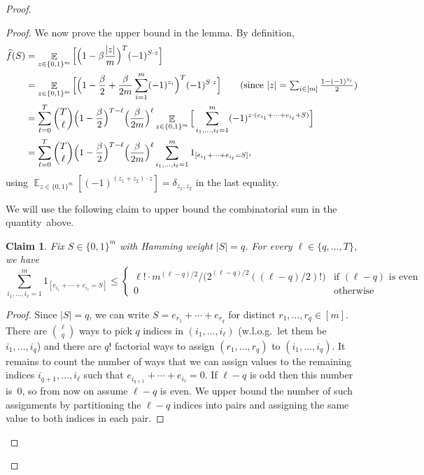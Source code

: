\documentclass[twoside,11pt]{article}
\DeclareMathOperator*{\Ex}{\mathbb{E}}
\newtheorem{claim}[theorem]{Claim}
\def\01{\{0,1\}}
\begin{document}
\begin{proof}
\begin{proof}
		We now prove the upper bound in the lemma. By definition,
		\begin{align*}
		\widehat{f}(S)&=\Ex_{z\in \01^m} \Big[\Big(1-\beta\frac{|z|}{m}\Big)^T (-1)^{S\cdot z}\Big] \\
		&=\Ex_{z\in \01^m} \Big[\Big(1-\frac{\beta}{2}+\frac{\beta}{2m} \sum_{i=1}^m (-1)^{z_i}\Big)^T (-1)^{S\cdot z} \Big]\tag{since $|z|=\sum_{i\in [m]} \frac{1-(-1)^{z_i}}{2}$}\\
		&=\sum_{\ell=0}^T \binom{T}{\ell} \Big(1-\frac{\beta}{2}\Big)^{T-\ell}\Big(\frac{\beta}{2m}\Big)^{\ell} \Ex_{z\in \01^m} \Big[\sum_{i_1,\ldots, i_\ell=1}^m (-1)^{z\cdot (e_{i_1}+\cdots+e_{i_\ell}+S)}\Big]\\
		&=\sum_{\ell=0}^T \binom{T}{\ell} \Big(1-\frac{\beta}{2}\Big)^{T-\ell}\Big(\frac{\beta}{2m}\Big)^{\ell}\sum_{i_1,\ldots, i_\ell=1}^m 1_{[e_{i_1}+\cdots+e_{i_\ell}=S]},
		\end{align*}
using $\Ex_{z\in \01^m} [(-1)^{(z_1+z_2)\cdot z}]=\delta_{z_1,z_2}$ in the last equality.

		We will use the following claim to upper bound the combinatorial sum in the quantity~above. \\
		
		\begin{claim}
			\label{claim:combinatorialcounting}
			Fix $S\in \01^m$ with Hamming weight $|S|=q$. For every $\ell\in \{q,\ldots, T\}$, we have
			\[\sum_{i_1,\ldots, i_\ell=1}^m 1_{[e_{i_1}+\cdots+e_{i_\ell}=S]}\leq 
			\begin{cases} 
			\ell! \cdot m^{(\ell-q)/2}\Big/ \Big(2^{(\ell-q)/2} ((\ell-q)/2)!\Big) &  \text{if }(\ell-q) \text{ is even } \\
			0 & \text{otherwise} 
			\end{cases}
			\]
		\end{claim}
		\begin{proof}
			Since $|S|=q$, we can write $S=e_{r_1}+\cdots +e_{r_q}$ for distinct $r_1,\ldots,r_q \in [m]$. There are $\binom {\ell}{q}$ ways to pick $q$ indices in $(i_1,\ldots ,i_\ell)$ (w.l.o.g.\ let them be $i_1,\ldots,i_q$) and there are $q!$ factorial ways to assign $(r_1,\ldots,r_q)$ to $(i_1,\ldots,i_q)$. It remains to count the number of ways that we can assign values to the remaining indices $i_{q+1},\ldots, i_\ell$ such that $e_{i_{q+1}}+\cdots +e_{i_\ell} =0$. If $\ell-q$ is odd then this number is~0, so from now on assume $\ell-q$ is even. We upper bound the number of such assignments by partitioning the $\ell-q$ indices into pairs and assigning the same value to both indices in each pair.
			

\end{proof}
\end{proof}
\end{proof}
\end{document}
